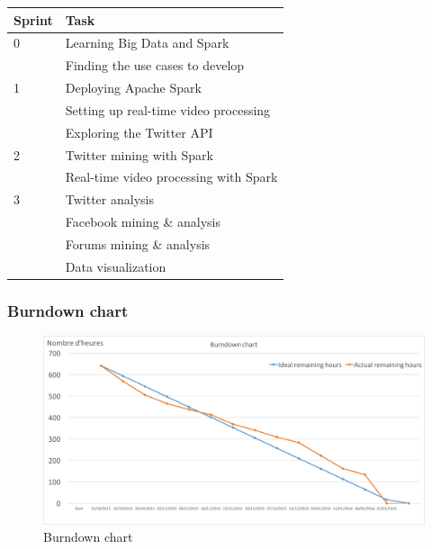 \documentclass[11pt]{article}
\begin{document}
\begin{center}
\begin{tabular}{|l|l|}
  \hline
  Sprint & Task \\
  \hline
  0 & Learning Big Data and Spark \\
    & Finding the use cases to develop \\ \hline
  1 & Deploying Apache Spark \\
    & Setting up real-time video processing \\
    & Exploring the Twitter API \\ \hline
  2 & Twitter mining with Spark \\
    & Real-time video processing with Spark \\ \hline
  3 & Twitter analysis \\
    & Facebook mining \& analysis \\
    & Forums mining \& analysis \\
    & Data visualization \\
  \hline
\end{tabular}
\end{center}




\subsubsection{Burndown chart}

\begin{figure}[h!]
    \centering
    \includegraphics[scale=0.5]{img/burndown.png}
    \caption{Burndown chart}
    \label{gantt}
\end{figure}
\end{document}
